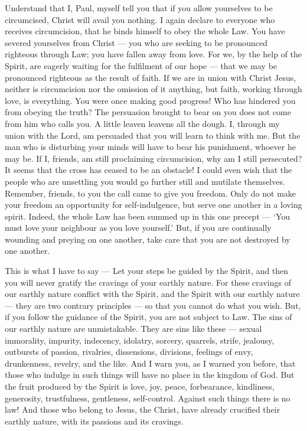  Understand that I, Paul, myself tell you that if you allow
yourselves to be circumcised, Christ will avail you nothing.
 I again declare to everyone who receives circumcision, that
he binds himself to obey the whole Law.  You have severed
yourselves from Christ --- you who are seeking to be pronounced
righteous through Law; you have fallen away from love.  For
we, by the help of the Spirit, are eagerly waiting for the fulfilment of
our hope --- that we may be pronounced righteous as the result of faith.
 If we are in union with Christ Jesus, neither is
circumcision nor the omission of it anything, but faith, working through
love, is everything.  You were once making good progress!
Who has hindered you from obeying the truth?  The persuasion
brought to bear on you does not come from him who calls you.
 A little leaven leavens all the dough.  I,
through my union with the Lord, am persuaded that you will learn to
think with me. But the man who is disturbing your minds will have to
bear his punishment, whoever he may be.  If I, friends, am
still proclaiming circumcision, why am I still persecuted? It seems that
the cross has ceased to be an obstacle!  I could even wish
that the people who are unsettling you would go further still and
mutilate themselves.  Remember, friends, to you the call
came to give you freedom. Only do not make your freedom an opportunity
for self-indulgence, but serve one another in a loving spirit.
 Indeed, the whole Law has been summed up in this one
precept --- `You must love your neighbour as you love yourself.'
 But, if you are continually wounding and preying on one
another, take care that you are not destroyed by one another.

 This is what I have to say --- Let your steps be guided by
the Spirit, and then you will never gratify the cravings of your earthly
nature.  For these cravings of our earthly nature conflict
with the Spirit, and the Spirit with our earthly nature --- they are two
contrary principles --- so that you cannot do what you wish.
 But, if you follow the guidance of the Spirit, you are not
subject to Law.  The sins of our earthly nature are
unmistakable. They are sins like these --- sexual immorality, impurity,
indecency,  idolatry, sorcery, quarrels, strife, jealousy,
outbursts of passion, rivalries, dissensions, divisions, 
feelings of envy, drunkenness, revelry, and the like. And I warn you, as
I warned you before, that those who indulge in such things will have no
place in the kingdom of God.  But the fruit produced by the
Spirit is love, joy, peace, forbearance, kindliness, generosity,
trustfulness, gentleness, self-control.  Against such
things there is no law!  And those who belong to Jesus, the
Christ, have already crucified their earthly nature, with its passions
and its cravings.

